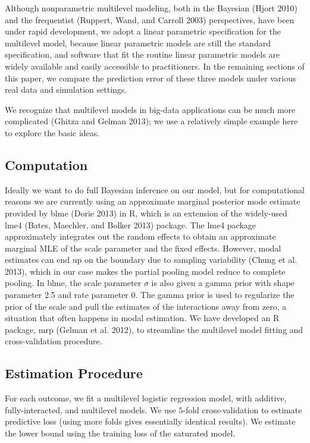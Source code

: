 \documentclass[11pt,article,oneside]{memoir}
\begin{document}
Although nonparametric multilevel modeling, both in the Bayesian (Hjort
2010) and the frequentist (Ruppert, Wand, and Carroll 2003)
perspectives, have been under rapid development, we adopt a linear
parametric specification for the multilevel model, because linear
parametric models are still the standard specification, and software
that fit the routine linear parametric models are widely available and
easily accessible to practitioners. In the remaining sections of this
paper, we compare the prediction error of these three models under
various real data and simulation settings.

We recognize that multilevel models in big-data applications can be much
more complicated (Ghitza and Gelman 2013); we use a relatively simple
example here to explore the basic ideas.

\subsection{Computation}\label{computation}

Ideally we want to do full Bayesian inference on our model, but for
computational reasons we are currently using an approximate marginal
posterior mode estimate provided by blme (Dorie 2013) in R, which is an
extension of the widely-used lme4 (Bates, Maechler, and Bolker 2013)
package. The lme4 package approximately integrates out the random
effects to obtain an approximate marginal MLE of the scale parameter and
the fixed effects. However, modal estimates can end up on the boundary
due to sampling variability (Chung et al. 2013), which in our case makes
the partial pooling model reduce to complete pooling. In blme, the scale
parameter \(\sigma\) is also given a gamma prior with shape parameter
2.5 and rate parameter 0. The gamma prior is used to regularize the
prior of the scale and pull the estimates of the interactions away from
zero, a situation that often happens in modal estimation. We have
developed an R package, mrp (Gelman et al. 2012), to streamline the
multilevel model fitting and cross-validation procedure.

\subsection{Estimation Procedure}\label{estimation-procedure}

For each outcome, we fit a multilevel logistic regression model, with
additive, fully-interacted, and multilevel models. We use \(5\)-fold
cross-validation to estimate predictive loss (using more folds gives
essentially identical results). We estimate the lower bound using the
training loss of the saturated model.
\end{document}
